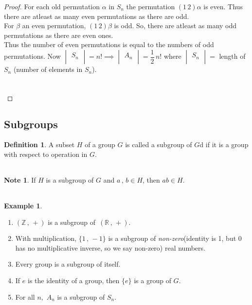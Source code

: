 \documentclass[11pt,a4paper]{article}
\theoremstyle{definition}
\newtheorem{defn}[thm]{Definition}
\newtheorem{exa}[thm]{Example}
\newtheorem*{note}{Note}
\begin{document}
\begin{proof}
For each old permutation $\alpha$ in $S_n$ the permutation $(1\,2)\alpha$ is even. Thus there are atleast as many even permutations as there are odd.\\
For $\beta$ an even permutation, $(1\,2)\beta$ is odd. So, there are atleast as many odd permutations as there are even ones.\\
Thus the number of even permutations is equal to the numbers of odd permutations. Now $\begin{vmatrix}
S_n\\
\end{vmatrix} = n! \implies \begin{vmatrix}
A_n\\
\end{vmatrix} = \dfrac{1}{2}\, n!$ where $\begin{vmatrix}
S_n\\
\end{vmatrix}  = $ length of $S_n$ (number of elements in $S_n$).\\\\\\
\end{proof}





\subsection{Subgroups}

\begin{defn}
A subset $H$ of a group $G$ is called a subgroup of $G$d if it is a group with respect to operation in $G$.\\\\
\end{defn}




\begin{note}
If $H$ is a subgroup of $G$ and $a\, , \, b\in H$, then $ab\in H$.\\\\
\end{note}






\begin{exa}
\begin{enumerate}
\item $(\mathbb{Z}\, , \, +)$ is a subgroup of $\, (\mathbb{R}\, , \, +)$.
\item With multiplication, $\{1\, , \, -1\}$ is a subgroup of \textit{non-zero}(identity is 1, but 0 has no multiplicative inverse, so we say non-zero) real numbers.
\item Every group is a subgroup of itself.
\item If $e$ is the identity of a group, then $\{e\}$ is a group of $G$.
\item For all $n,\, \, A_n$ is a subgroup of $S_n$.\\\\
\end{enumerate}
\end{exa}
\end{document}
